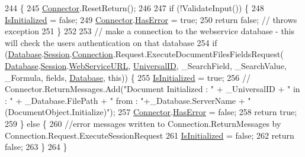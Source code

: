 \begin{DoxyCode}
244                                                             \{
245         \mbox{\hyperlink{class_connector}{Connector}}.ResetReturn();
246 
247         \textcolor{keywordflow}{if} (!ValidateInput()) \{
248             \mbox{\hyperlink{class_document_object_a3b2075b73f38d05091b69decc6ce7992}{IsInitialized}} = \textcolor{keyword}{false};
249             \mbox{\hyperlink{class_connector}{Connector}}.\mbox{\hyperlink{class_connector_a9365777a6b7b711b75bcfa6c4d53e989}{HasError}} = \textcolor{keyword}{true};
250             \textcolor{keywordflow}{return} \textcolor{keyword}{false};   \textcolor{comment}{// throws exception}
251         \}
252 
253         \textcolor{comment}{// make a connection to the webservice database - this will check the users authentication on that
       database}
254         \textcolor{keywordflow}{if} (\mbox{\hyperlink{class_document_object_a69d5338c9835f748490323d2950eed09}{Database}}.\mbox{\hyperlink{class_database_object_aa8484162b7d2a7c4c9426bca13c64c07}{Session}}.\mbox{\hyperlink{class_session_object_a014bdbf705a753540e19bfb53030c55c}{Connection}}.Request.ExecuteDocumentFilesFieldsRequest(
      \mbox{\hyperlink{class_document_object_a69d5338c9835f748490323d2950eed09}{Database}}.\mbox{\hyperlink{class_database_object_aa8484162b7d2a7c4c9426bca13c64c07}{Session}}.\mbox{\hyperlink{class_session_object_a697c071c812fbf7ad1166b896fb44c16}{WebServiceURL}}, \mbox{\hyperlink{class_document_object_a8b96d04632a2802e7cc5466ca5cee8cf}{UniversalID}}, \_SearchField, 
      \_SearchValue, \_Formula, fields, \mbox{\hyperlink{class_document_object_a69d5338c9835f748490323d2950eed09}{Database}}, \textcolor{keyword}{this})) \{
255             \mbox{\hyperlink{class_document_object_a3b2075b73f38d05091b69decc6ce7992}{IsInitialized}} = \textcolor{keyword}{true};
256             \textcolor{comment}{//  Connector.ReturnMessages.Add("Document Initialized : " + \_UniversalID + " in : " +
       \_Database.FilePath + " from : "+\_Database.ServerName + " (DocumentObject.Initialize)");}
257             \mbox{\hyperlink{class_connector}{Connector}}.\mbox{\hyperlink{class_connector_a9365777a6b7b711b75bcfa6c4d53e989}{HasError}} = \textcolor{keyword}{false};
258             \textcolor{keywordflow}{return} \textcolor{keyword}{true};
259         \} \textcolor{keywordflow}{else} \{
260             \textcolor{comment}{//error messages written to Connection.ReturnMessages by
       Connection.Request.ExecuteSessionRequest}
261             \mbox{\hyperlink{class_document_object_a3b2075b73f38d05091b69decc6ce7992}{IsInitialized}} = \textcolor{keyword}{false};
262             \textcolor{keywordflow}{return} \textcolor{keyword}{false};
263         \}
264     \}
\end{DoxyCode}


